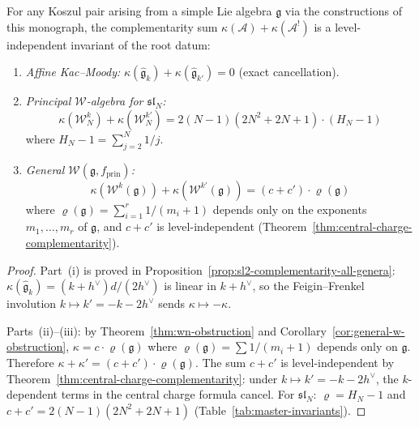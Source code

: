 \begin{theorem}
\label{thm:complementarity-root-datum}
For any Koszul pair arising from a simple Lie algebra $\mathfrak{g}$ via the constructions of this monograph, the complementarity sum $\kappa(\mathcal{A}) + \kappa(\mathcal{A}^!)$ is a level-independent invariant of the root datum:
\begin{enumerate}[label=\textup{(\roman*)}]
\item \emph{Affine Kac--Moody:} $\kappa(\widehat{\mathfrak{g}}_k) + \kappa(\widehat{\mathfrak{g}}_{k'}) = 0$ \textup{(}exact cancellation\textup{)}.
\item \emph{Principal $\mathcal{W}$-algebra for $\mathfrak{sl}_N$:}
\begin{equation}\label{eq:wn-kappa-sum-general}
\kappa(\mathcal{W}_N^k) + \kappa(\mathcal{W}_N^{k'}) = 2(N{-}1)(2N^2{+}2N{+}1) \cdot (H_N - 1)
\end{equation}
where $H_N - 1 = \sum_{j=2}^N 1/j$.
\item \emph{General $\mathcal{W}(\mathfrak{g}, f_{\mathrm{prin}})$:}
\begin{equation}\label{eq:general-w-kappa-sum}
\kappa(\mathcal{W}^k(\mathfrak{g})) + \kappa(\mathcal{W}^{k'}(\mathfrak{g})) = (c + c') \cdot \varrho(\mathfrak{g})
\end{equation}
where $\varrho(\mathfrak{g}) = \sum_{i=1}^r 1/(m_i + 1)$ depends only on the exponents $m_1, \ldots, m_r$ of $\mathfrak{g}$, and $c + c'$ is level-independent \textup{(}Theorem~\textup{\ref{thm:central-charge-complementarity})}.
\end{enumerate}
\end{theorem}

\begin{proof}
Part~(i) is proved in Proposition~\ref{prop:sl2-complementarity-all-genera}: $\kappa(\widehat{\mathfrak{g}}_k) = (k+h^\vee) d / (2h^\vee)$ is linear in $k+h^\vee$, so the Feigin--Frenkel involution $k \mapsto k' = -k-2h^\vee$ sends $\kappa \mapsto -\kappa$.

Parts~(ii)--(iii): by Theorem~\ref{thm:wn-obstruction} and Corollary~\ref{cor:general-w-obstruction}, $\kappa = c \cdot \varrho(\mathfrak{g})$ where $\varrho(\mathfrak{g}) = \sum 1/(m_i+1)$ depends only on $\mathfrak{g}$.  Therefore $\kappa + \kappa' = (c+c') \cdot \varrho(\mathfrak{g})$.  The sum $c + c'$ is level-independent by Theorem~\ref{thm:central-charge-complementarity}: under $k \mapsto k' = -k-2h^\vee$, the $k$-dependent terms in the central charge formula cancel.  For $\mathfrak{sl}_N$: $\varrho = H_N - 1$ and $c+c' = 2(N-1)(2N^2+2N+1)$ (Table~\ref{tab:master-invariants}).
\end{proof}


